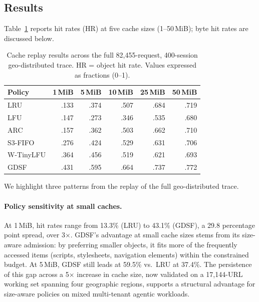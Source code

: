 \documentclass[10pt,sigconf,letterpaper,anonymous,nonacm]{acmart}
\begin{document}
\subsection{Results}

Table~\ref{tab:replay} reports hit rates (HR) at five cache sizes
(1--50\,MiB); byte hit rates are discussed below.

\begin{table}[t]
\centering
\small
\caption{Cache replay results across the full 82{,}455-request,
  400-session geo-distributed trace.  HR = object hit rate.
  Values expressed as fractions (0--1).}
\label{tab:replay}
\setlength{\tabcolsep}{4pt}
\begin{tabular}{@{}lrrrrr@{}}
\toprule
\textbf{Policy} & \textbf{1\,MiB} & \textbf{5\,MiB} & \textbf{10\,MiB} & \textbf{25\,MiB} & \textbf{50\,MiB} \\
\midrule
LRU       & .133 & .374 & .507 & .684 & .719 \\
LFU       & .147 & .273 & .346 & .535 & .680 \\
ARC       & .157 & .362 & .503 & .662 & .710 \\
S3-FIFO   & .276 & .424 & .529 & .631 & .706 \\
W-TinyLFU & .364 & .456 & .519 & .621 & .693 \\
GDSF      & .431 & .595 & .664 & .737 & .772 \\
\bottomrule
\end{tabular}
\end{table}

We highlight three patterns from the replay of the full geo-distributed trace.

\paragraph{Policy sensitivity at small caches.}
At 1\,MiB, hit rates range from 13.3\% (LRU) to 43.1\% (GDSF), a
29.8 percentage point spread, over 3$\times$.  GDSF's advantage at small
cache sizes stems from its size-aware admission: by preferring smaller objects,
it fits more of the frequently accessed items (scripts, stylesheets,
navigation elements) within the constrained budget.  At 5\,MiB, GDSF
still leads at 59.5\% vs.\ LRU at 37.4\%.  The persistence of this gap
across a 5$\times$ increase in cache size, now validated on a 17{,}144-URL
working set spanning four geographic regions, supports a structural
advantage for size-aware policies on mixed multi-tenant agentic workloads.
\end{document}
